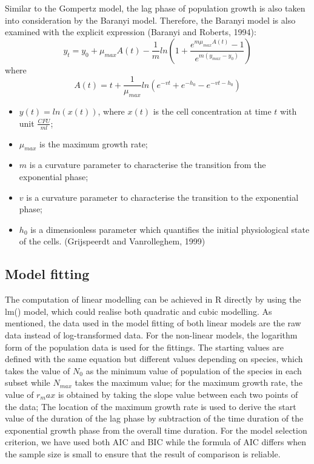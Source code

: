 \documentclass[11pt, oneside]{article}
\begin{document}
			Similar to the Gompertz model, the lag phase of population growth is also taken into consideration by the Baranyi model. Therefore, the Baranyi model is also examined with the explicit expression \cite{Baranyi}(Baranyi and Roberts, 1994):
			\[y_t = y_0 + \mu_{max} A(t) - \frac{1}{m}ln(1 + \frac{e^{m\mu_{max}A(t)} - 1}{e^{m(y_{max} - y_0)}})\]
			where
			\[A(t) = t + \frac{1}{\mu_{max}}ln(e^{-vt} + e^{-h_0} - e^{-vt - h_0}) \]
			\begin{itemize}
			\item \(y(t) = ln(x(t))\), where \(x(t)\) is the cell concentration at time \(t\) with unit \(\frac{CFU}{ml}\);
			\item \(\mu_{max}\) is the maximum growth rate;
			\item \(m\) is a curvature parameter to characterise the transition from the exponential phase;
			\item \(v\) is a curvature parameter to characterise the transition to the exponential phase;
			\item \(h_0\) is a dimensionless parameter which quantifies the initial physiological state of the cells. \cite{Grijspeerdt}(Grijspeerdt and Vanrolleghem, 1999)
			\end{itemize}

 		\subsection{Model fitting}
		
		The computation of linear modelling can be achieved in R directly by using the lm() model, which could realise both quadratic and cubic modelling. As mentioned, the data used in the model fitting of both linear models are the raw data instead of log-transformed data. For the non-linear models, the logarithm form of the population data is used for the fittings. The starting values are defined with the same equation but different values depending on species, which takes the value of \(N_0\) as the minimum value of population of the species in each subset while \(N_{max}\) takes the maximum value; for the maximum growth rate, the value of \(r_max\) is obtained by taking the slope value between each two points of the data; The location of the maximum growth rate is used to derive the start value of the duration of the lag phase by subtraction of the time duration of the exponential growth phase from the overall time duration. For the model selection criterion, we have used both AIC and BIC while the formula of AIC differs when the sample size is small to ensure that the result of comparison is reliable. 
\end{document}
